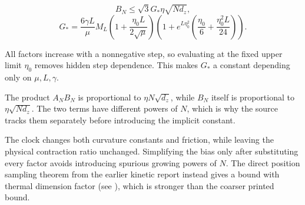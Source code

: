 \documentclass[11pt,a4paper]{report}
\begin{document}
\[B_N\le\sqrt3G_*\eta\sqrt{Nd_z},\]
\[G_*=\frac{6\gamma L}{\mu}M_L
\left(1+\frac{\eta_0L}{2\sqrt\mu}\right)
\left(1+e^{L\eta_0^2}
\left(\frac{\eta_0}{6}+\frac{\eta_0^2L}{24}\right)\right).\]


All factors increase with a nonnegative step, so evaluating at the fixed
upper limit \(\eta_0\) removes hidden step dependence. This makes \(G_*\)
a constant depending only on \(\mu,L,\gamma\).




The product \(A_NB_N\) is proportional to \(\eta N\sqrt{d_z}\), while
\(B_N\) itself is proportional to \(\eta\sqrt{Nd_z}\). The two terms have
different powers of \(N\), which is why the source tracks them separately
before introducing the implicit constant.



The clock changes both curvature constants and friction, while leaving the physical contraction ratio unchanged. Simplifying the bias only after substituting every factor avoids introducing spurious growing powers of \(N\). The direct position sampling theorem from the earlier kinetic report instead gives a bound with thermal dimension factor (see \cite[Section~3.123.4]{LangevinLean2026Kinetic}), which is stronger than the coarser printed bound.
\end{document}
